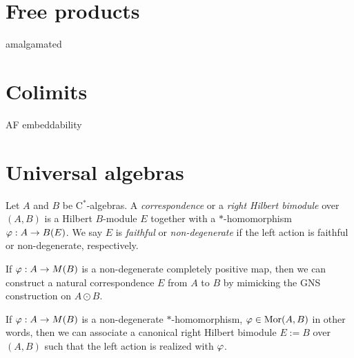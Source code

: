 \documentclass{../../large}
\begin{document}
\section{Free products}

amalgamated


\section{Colimits}

\begin{prb}
\end{prb}

\begin{prb}
\end{prb}


AF embeddability


\begin{prb}

\end{prb}









\section{Universal algebras}

\begin{prb}
\end{prb}
\begin{prb}
\end{prb}
\begin{prb}
\end{prb}




\begin{prb}[C$^*$-correspondences]
Let $A$ and $B$ be C$^*$-algebras.
A \emph{correspondence} or a \emph{right Hilbert bimodule} over $(A,B)$ is a Hilbert $B$-module $E$ together with a $*$-homomorphism $\varphi:A\to B(E)$.
We say $E$ is \emph{faithful} or \emph{non-degenerate} if the left action is faithful or non-degenerate, respectively.
\begin{parts}
\item If $\varphi:A\to M(B)$ is a non-degenerate completely positive map, then we can construct a natural correspondence $E$ from $A$ to $B$ by mimicking the GNS construction on $A\odot B$.
\item If $\varphi:A\to M(B)$ is a non-degenerate $*$-homomorphism, $\varphi\in\operatorname{Mor}(A,B)$ in other words, then we can associate a canonical right Hilbert bimodule $E:=B$ over $(A,B)$ such that the left action is realized with $\varphi$.
\end{parts}
\end{prb}
\end{document}
